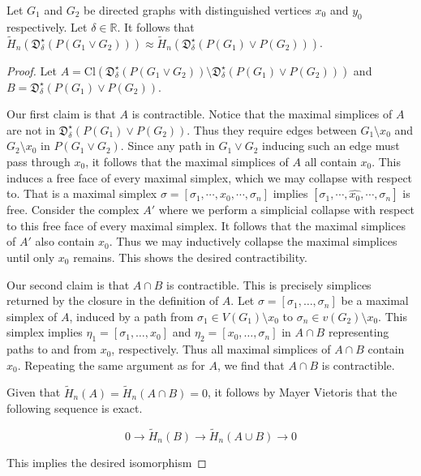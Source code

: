 \documentclass[10pt,a4paper]{amsart}
\newcommand{\FD}{\mathfrak{D}}
\begin{document}
\begin{lem}\label{lem:path_wedge}
    Let $G_1$ and $G_2$ be directed graphs with distinguished vertices $x_0$ and $y_0$ respectively. Let $\delta\in\mathbb{R}$. It follows that  $\tilde{H}_n(\FD^\star_\delta(P(G_1\vee G_2)))
    \approx
    \tilde{H}_n(\FD^\star_\delta(P(G_1)\vee P(G_2)))
        $.
\end{lem}

\begin{proof}
    Let $A= \text{Cl}(\FD^\star_\delta(P(G_1\vee G_2))\setminus \FD^\star_\delta(P(G_1)\vee P(G_2)))$ and $B=\FD^\star_\delta(P(G_1)\vee P(G_2))$.

    Our first claim is that $A$ is contractible. Notice that the maximal simplices of $A$ are not in $\FD^\star_\delta(P(G_1)\vee P(G_2))$. Thus they require edges between $G_1\setminus x_0$ and $G_2\setminus x_0$ in $P(G_1\vee G_2)$. Since any path in $G_1\vee G_2$ inducing such an edge must pass through $x_0$, it follows that the maximal simplices of $A$ all contain $x_0$. This induces a free face of every maximal simplex, which we may collapse with respect to. That is a maximal simplex $\sigma=[\sigma_1,\cdots,x_0,\cdots,\sigma_n]$ implies $ [\sigma_1,\cdots,\hat{x_0},\cdots,\sigma_n]$ is free. Consider the complex $A'$ where we perform a simplicial collapse with respect to this free face of every maximal simplex. It follows that the maximal simplices of $A'$ also contain $x_0$. Thus we may inductively collapse the maximal simplices until only $x_0$ remains. This shows the desired contractibility.

    Our second claim is that $A\cap B$ is contractible. This is precisely simplices returned by the closure in the definition of $A$. Let $\sigma=[\sigma_1,\dotsc,\sigma_n]$ be a maximal simplex of $A$, induced by a path from $\sigma_1\in V(G_1)\setminus x_0$ to $\sigma_n\in v(G_2)\setminus x_0$. This simplex implies $\eta_1=[\sigma_1,\dotsc,x_0]$ and $\eta_2=[x_0,\dotsc,\sigma_n]$ in $A\cap B$ representing paths to and from $x_0$, respectively. Thus all maximal simplices of $A\cap B$ contain $x_0$. Repeating the same argument as for $A$, we find that $A\cap B$  is contractible.

    Given that $\tilde{H}_n(A)=\tilde{H}_n(A\cap B)=0$, it follows by Mayer Vietoris that the following sequence is exact.

    \[
    0
    \longrightarrow
    \tilde{H}_n(B)
    \longrightarrow
    \tilde{H}_n(A\cup B)
    \longrightarrow
    0
    \]

    This implies the desired isomorphism


\end{proof}
\end{document}
